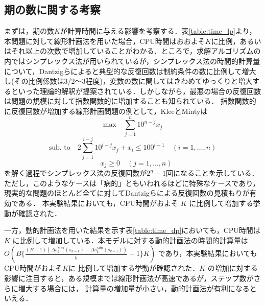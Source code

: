 \subsection{期の数に関する考察}
まずは，期の数$K$が計算時間に与える影響を考察する．表\ref{table:time_lp}より，本問題に対して線形計画法を用いた場合，CPU時間はおおよそ$K$に比例，あるいはそれ以上の次数で増加していることがわかる．ところで，求解アルゴリズムの内ではシンプレックス法が用いられているが，シンプレックス法の時間的計算量について，Dantzigらによると典型的な反復回数は制約条件の数に比例して増大し(その比例係数は3/2〜3程度)，変数の数に関してはきわめてゆっくりと増大するといった理論的解釈が提案されている\cite{h}\cite{l}．しかしながら，最悪の場合の反復回数は問題の規模に対して指数関数的に増加することも知られている．
指数関数的に反復回数が増加する線形計画問題の例として，KleeとMintyは
\begin{equation}
	\text{max} \quad \sum_{j=1}^n 10^{n-j}x_j
	\label{eq:Klee_Minty_max}
\end{equation}
\begin{equation}
	\text{sub. to} \quad 2\sum_{j=1}^{i-j} 10^{i-j}x_j + x_i \leq 100^{i-1} \quad (i=1,\ldots, n)
	\label{eq:Klee_Minty_sub1}
\end{equation}
\begin{equation}
	 \quad  x_{j} \geq 0 \quad (j=1,\ldots, n)
	\label{eq:Klee_Minty_sub2}
\end{equation}
を解く過程でシンプレックス法の反復回数が$2^n-1$回になることを示している\cite{k}．
ただし，このようなケースは「病的」ともいわれるほどに特殊なケースであり，現実的な問題のほとんど全てに対してDantzigらによる反復回数の見積もりが有効である\cite{h}．
本実験結果においても，CPU時間がおよそ $K$ に比例して増加する挙動が確認された．

一方，動的計画法を用いた結果を示す表\ref{table:time_dp}においても，CPU時間は $K$ に比例して増加している．本モデルに対する動的計画法の時間的計算量は\\
 $O(B\{ \frac{(B-1)(\Delta s_k^{\mathrm{Max}}(s_{k-1}) - \Delta s_k^{\mathrm{Min}}(s_{k-1}) )}{\overline{b}} +1\} K)$ であり，本実験結果においてもCPU時間がおよそ$K$に
比例して増加する挙動が確認された．$K$ の増加に対する影響に注目すると，ある規模までは線形計画法が高速であるが，ステップ数がさらに増大する場合には，
計算量の増加量が小さい，動的計画法が有利になるといえる．

